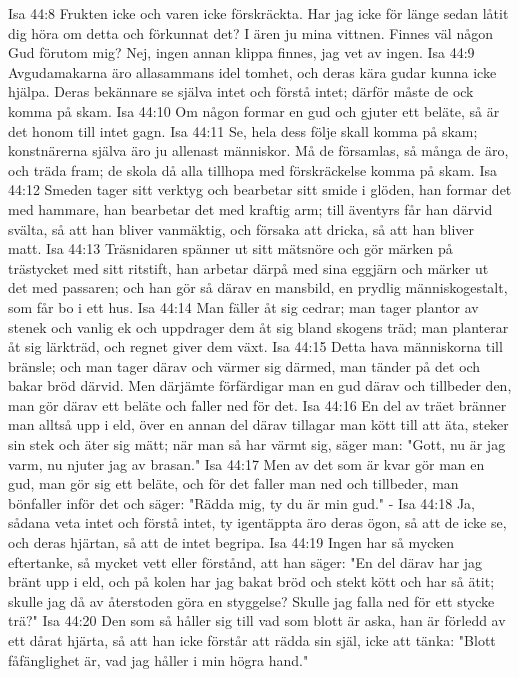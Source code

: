 Isa 44:8  Frukten icke och varen icke förskräckta. Har jag icke för länge sedan låtit dig höra om detta och förkunnat det? I ären ju mina vittnen. Finnes väl någon Gud förutom mig? Nej, ingen annan klippa finnes, jag vet av ingen.
Isa 44:9  Avgudamakarna äro allasammans idel tomhet, och deras kära gudar kunna icke hjälpa. Deras bekännare se själva intet och förstå intet; därför måste de ock komma på skam.
Isa 44:10  Om någon formar en gud och gjuter ett beläte, så är det honom till intet gagn.
Isa 44:11  Se, hela dess följe skall komma på skam; konstnärerna själva äro ju allenast människor. Må de församlas, så många de äro, och träda fram; de skola då alla tillhopa med förskräckelse komma på skam.
Isa 44:12  Smeden tager sitt verktyg och bearbetar sitt smide i glöden, han formar det med hammare, han bearbetar det med kraftig arm; till äventyrs får han därvid svälta, så att han bliver vanmäktig, och försaka att dricka, så att han bliver matt.
Isa 44:13  Träsnidaren spänner ut sitt mätsnöre och gör märken på trästycket med sitt ritstift, han arbetar därpå med sina eggjärn och märker ut det med passaren; och han gör så därav en mansbild, en prydlig människogestalt, som får bo i ett hus.
Isa 44:14  Man fäller åt sig cedrar; man tager plantor av stenek och vanlig ek och uppdrager dem åt sig bland skogens träd; man planterar åt sig lärkträd, och regnet giver dem växt.
Isa 44:15  Detta hava människorna till bränsle; och man tager därav och värmer sig därmed, man tänder på det och bakar bröd därvid. Men därjämte förfärdigar man en gud därav och tillbeder den, man gör därav ett beläte och faller ned för det.
Isa 44:16  En del av träet bränner man alltså upp i eld, över en annan del därav tillagar man kött till att äta, steker sin stek och äter sig mätt; när man så har värmt sig, säger man: "Gott, nu är jag varm, nu njuter jag av brasan."
Isa 44:17  Men av det som är kvar gör man en gud, man gör sig ett beläte, och för det faller man ned och tillbeder, man bönfaller inför det och säger: "Rädda mig, ty du är min gud." -
Isa 44:18  Ja, sådana veta intet och förstå intet, ty igentäppta äro deras ögon, så att de icke se, och deras hjärtan, så att de intet begripa.
Isa 44:19  Ingen har så mycken eftertanke, så mycket vett eller förstånd, att han säger: "En del därav har jag bränt upp i eld, och på kolen har jag bakat bröd och stekt kött och har så ätit; skulle jag då av återstoden göra en styggelse? Skulle jag falla ned för ett stycke trä?"
Isa 44:20  Den som så håller sig till vad som blott är aska, han är förledd av ett dårat hjärta, så att han icke förstår att rädda sin själ, icke att tänka: "Blott fåfänglighet är, vad jag håller i min högra hand."
